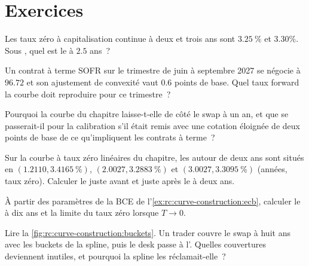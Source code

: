 \section{Exercices}

\begin{exercise}[$\star$]\label{exo:rc:curve-construction:1}
Les taux zéro à capitalisation continue à deux et trois ans sont $3.25~\%$
et $3.30\%$. Sous , quel est le
 à $2.5$ ans~?
\end{exercise}

\begin{exercise}[$\star$]\label{exo:rc:curve-construction:2}
Un contrat à terme SOFR sur le trimestre de juin à septembre 2027 se négocie à $96.72$ et
son ajustement de convexité vaut $0.6$ points de base. Quel taux forward la courbe doit
reproduire pour ce trimestre~?
\end{exercise}

\begin{exercise}[$\star$]\label{exo:rc:curve-construction:3}
Pourquoi la courbe du chapitre laisse-t-elle de côté le swap à un an, et que
se passerait-il pour la calibration s'il était remis avec une cotation éloignée de deux points de base
de ce qu'impliquent les contrats à terme~?
\end{exercise}

\begin{exercise}[$\star\star$]\label{exo:rc:curve-construction:4}
Sur la courbe à taux zéro linéaires du chapitre, les  autour de deux ans sont situés en
$(1.2110, 3.4165~\%)$, $(2.0027, 3.2883~\%)$ et $(3.0027, 3.3095~\%)$ (années,
taux zéro). Calculer le  juste avant et juste après le
 à deux ans.
\end{exercise}

\begin{exercise}[$\star\star$]\label{exo:rc:curve-construction:5}
À partir des paramètres de la BCE de l'\cref{ex:rc:curve-construction:ecb}, calculer le
 à dix ans et la limite du taux zéro lorsque $T\to 0$.
\end{exercise}

\begin{exercise}[$\star\star$]\label{exo:rc:curve-construction:6}
Lire la \cref{fig:rc:curve-construction:buckets}. Un trader couvre le swap à huit ans
avec les buckets de la spline, puis le desk passe à l'. Quelles
couvertures deviennent inutiles, et pourquoi la spline les réclamait-elle~?
\end{exercise}

